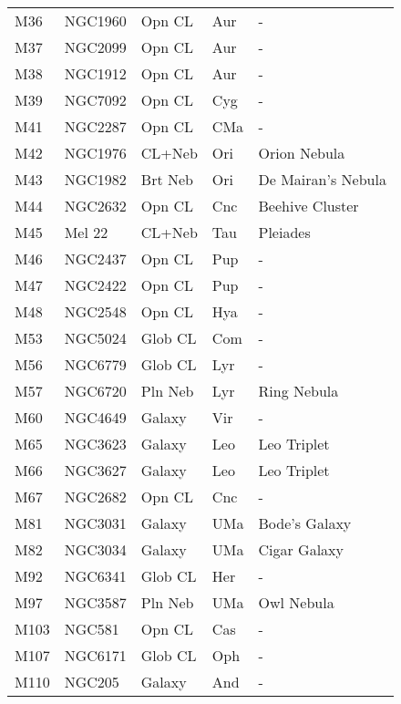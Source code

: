 \begin{longtable}{ p{0.7in}  p{1.0in}  p{0.6in}  p{0.9in}  p{4.0in} }
M36 & NGC1960 & Opn CL & Aur & - \\ 
M37 & NGC2099 & Opn CL & Aur & - \\ 
M38 & NGC1912 & Opn CL & Aur & - \\ 
M39 & NGC7092 & Opn CL & Cyg & - \\ 
M41 & NGC2287 & Opn CL & CMa & - \\ 
M42 & NGC1976 & CL+Neb & Ori & Orion Nebula \\ 
M43 & NGC1982 & Brt Neb & Ori & De Mairan's Nebula \\ 
M44 & NGC2632 & Opn CL & Cnc & Beehive Cluster \\ 
M45 & Mel 22 & CL+Neb & Tau & Pleiades \\ 
M46 & NGC2437 & Opn CL & Pup & - \\ 
M47 & NGC2422 & Opn CL & Pup & - \\ 
M48 & NGC2548 & Opn CL & Hya & - \\ 
M53 & NGC5024 & Glob CL & Com & - \\ 
M56 & NGC6779 & Glob CL & Lyr & - \\ 
M57 & NGC6720 & Pln Neb & Lyr & Ring Nebula \\ 
M60 & NGC4649 & Galaxy & Vir & - \\ 
M65 & NGC3623 & Galaxy & Leo & Leo Triplet \\ 
M66 & NGC3627 & Galaxy & Leo & Leo Triplet \\ 
M67 & NGC2682 & Opn CL & Cnc & - \\ 
M81 & NGC3031 & Galaxy & UMa & Bode's Galaxy \\ 
M82 & NGC3034 & Galaxy & UMa & Cigar Galaxy \\ 
M92 & NGC6341 & Glob CL & Her & - \\ 
M97 & NGC3587 & Pln Neb & UMa & Owl Nebula \\ 
M103 & NGC581 & Opn CL & Cas & - \\ 
M107 & NGC6171 & Glob CL & Oph & - \\ 
M110 & NGC205 & Galaxy & And & - \\ 
\hline 
\end{longtable} 
